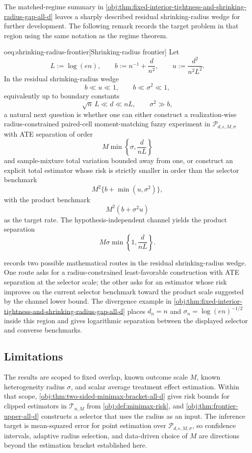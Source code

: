 \documentclass[11pt]{article}
\begin{document}
The matched-regime summary in \cref{obj:thm:fixed-interior-tightness-and-shrinking-radius-gap-all-d} leaves a sharply described residual shrinking-radius wedge for further development. The following remark records the target problem in that region using the same notation as the regime theorem.

\begin{remarkv}{oeq:shrinking-radius-frontier}[Shrinking-radius frontier]
Let
\[
L:=\log(en),\qquad
b:=n^{-1}+\frac{d}{n^2},\qquad
u:=\frac{d^2}{n^2L^2}.
\]
In the residual shrinking-radius wedge
\[
b\ll u\ll1,
\qquad
b\ll\sigma^2\ll1,
\]
equivalently up to boundary constants
\[
\sqrt n\,L\ll d\ll nL,
\qquad
\sigma^2\gg b,
\]
a natural next question is whether one can either construct a realization-wise radius-constrained paired-cell moment-matching fuzzy experiment in \(\mathcal P_{d,\epsilon,M,\sigma}\) with ATE separation of order
\[
M\min\left\{\sigma,\frac{d}{nL}\right\}
\]
and sample-mixture total variation bounded away from one, or construct an explicit total estimator whose risk is strictly smaller in order than the selector benchmark
\[
M^2\{b+\min(u,\sigma^2)\},
\]
with the product benchmark
\[
M^2(b+\sigma^2u)
\]
as the target rate. The hypothesis-independent channel yields the product separation
\[
M\sigma\min\left\{1,\frac{d}{nL}\right\}.
\]
\end{remarkv}

 records two possible mathematical routes in the residual shrinking-radius wedge. One route asks for a radius-constrained least-favorable construction with ATE separation at the selector scale; the other asks for an estimator whose risk improves on the current selector benchmark toward the product scale suggested by the channel lower bound. The divergence example in \cref{obj:thm:fixed-interior-tightness-and-shrinking-radius-gap-all-d} places \(d_n=n\) and \(\sigma_n=\log(en)^{-1/2}\) inside this region and gives logarithmic separation between the displayed selector and converse benchmarks.

\subsection{Limitations}

The results are scoped to fixed overlap, known outcome scale \(M\), known heterogeneity radius \(\sigma\), and scalar average treatment effect estimation. Within that scope, \cref{obj:thm:two-sided-minimax-bracket-all-d} gives risk bounds for clipped estimators in \(\mathcal T_{n,M}\) from \cref{obj:def:minimax-risk}, and \cref{obj:thm:frontier-upper-all-d} constructs a selector that uses the radius as an input. The inference target is mean-squared error for point estimation over \(\mathcal P_{d,\epsilon,M,\sigma}\), so confidence intervals, adaptive radius selection, and data-driven choice of \(M\) are directions beyond the estimation bracket established here.
\end{document}
